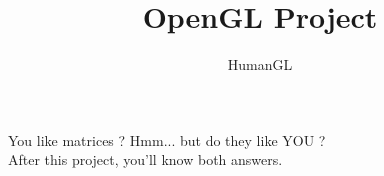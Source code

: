 \documentclass{42-en}
\begin{document}

\title{OpenGL Project}

\subtitle{HumanGL}


\summary
{
  You like matrices ? Hmm... but do they like YOU ? \\
  After this project, you'll know both answers.
}

\maketitle

\tableofcontents


\newpage

\end{document}
